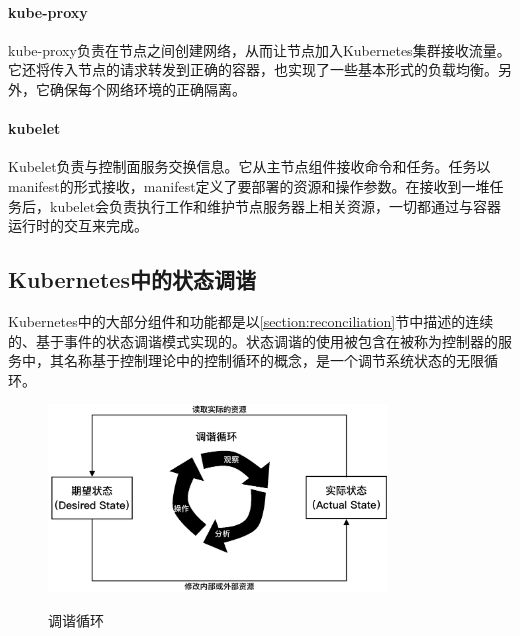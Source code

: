 \documentclass[macfonts,master]{njuthesis}
\begin{document}
\paragraph{kube-proxy}
kube-proxy负责在节点之间创建网络，从而让节点加入Kubernetes集群接收流量。它还将传入节点的请求转发到正确的容器，也实现了一些基本形式的负载均衡。另外，它确保每个网络环境的正确隔离。

\paragraph{kubelet}
Kubelet负责与控制面服务交换信息。它从主节点组件接收命令和任务。任务以manifest的形式接收，manifest定义了要部署的资源和操作参数。在接收到一堆任务后，kubelet会负责执行工作和维护节点服务器上相关资源，一切都通过与容器运行时的交互来完成。

\subsection{Kubernetes中的状态调谐}\label{section:controller-pattern}

Kubernetes中的大部分组件和功能都是以\ref{section:reconciliation}节中描述的连续的、基于事件的状态调谐模式实现的。状态调谐的使用被包含在被称为控制器的服务中，其名称基于控制理论中的控制循环的概念，是一个调节系统状态的无限循环\cite{k8scontroller}。

\begin{figure}[htbp]
  \centering
  \includegraphics[width=0.8\textwidth]{pics/Control-Loop.pdf}\\
  \caption{调谐循环}\label{fig:k8s-controller-pattern}
\end{figure}

\end{document}

